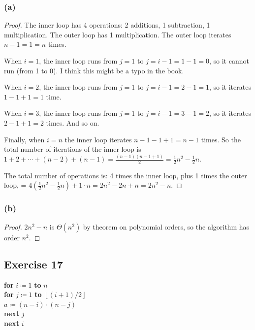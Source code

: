\documentclass[14pt]{extarticle}
\newcommand{\floor}[1]{{\left\lfloor#1\right\rfloor}}
\begin{document}
\subsubsection{(a)}
\begin{proof}
The inner loop has 4 operations: 2 additions, 1 subtraction, 1 multiplication. The outer loop has 1 multiplication. The outer
loop iterates \(n-1=1 = n\) times.

When \(i = 1\), the inner loop runs from \(j = 1\) to \(j = i-1 = 1-1 = 0\), so it cannot run (from 1 to 0). I think this
might be a typo in the book.

When \(i = 2\), the inner loop runs from \(j = 1\) to \(j = i-1 = 2-1 = 1\), so it iterates \(1 - 1 + 1 = 1\) time.

When \(i = 3\), the inner loop runs from \(j = 1\) to \(j = i-1 = 3-1 = 2\), so it iterates \(2-1+1=2\) times. And so on.

Finally, when \(i = n\) the inner loop iterates \(n-1 - 1 + 1 = n-1\) times. So the total number of iterations of the inner
loop is \(1+2+\cdots+(n-2)+(n-1) = \frac{(n-1)(n-1+1)}{2} = \frac{1}{2}n^2 - \frac{1}{2}n\).

The total number of operations is: 4 times the inner loop, plus 1 times the outer loop, = \(4\left(\frac{1}{2}n^2-
\frac{1}{2}n\right) + 1 \cdot n = 2n^2 - 2n + n = 2n^2 - n\).
\end{proof}

\subsubsection{(b)}
\begin{proof}
\(2n^2 - n\) is \(\Theta(n^2)\) by theorem on polynomial orders, so the algorithm has order \(n^2\).
\end{proof}

\subsection{Exercise 17}
\begin{tabbing}
{\bf for} \= \(i \coloneqq 1\) {\bf to} \(n\) \\
          \> {\bf for} \= \(j \coloneqq 1\) {\bf to} \(\floor{(i+1)/2}\)\\
          \>           \> \(a \coloneqq (n-i)\cdot(n-j)\) \\
          \> {\bf next} \(j\) \\
{\bf next} \(i\)
\end{tabbing}
\end{document}
